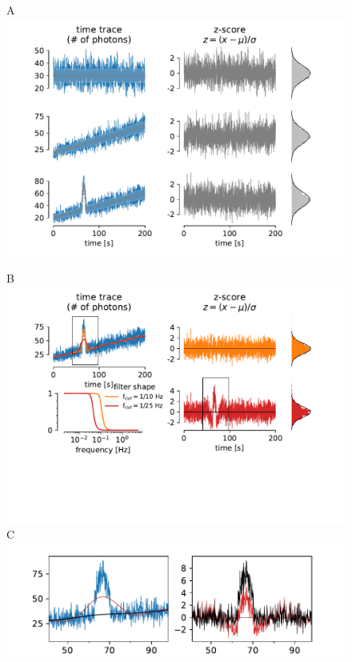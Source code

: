 \documentclass[a4paper,11pt,oneside,]{article}
\begin{document}
\begin{figure}[t]
    \centering
    \begin{minipage}{.49\textwidth}
        {\selectfont A} \includegraphics[scale=.5,trim=13mm 0 0 0,clip,align=t]{figures/z_score_1.pdf}
    \end{minipage}
    \begin{minipage}{.49\textwidth} 
        {\selectfont B} \includegraphics[scale=.5,trim=15mm 30mm 0 0,clip,align=t]{figures/z_score_2.pdf}
        {\selectfont C} \includegraphics[scale=.48,trim=5mm 0mm 0 0,clip,align=t]{figures/z_score_3.pdf}

\end{minipage}
\end{figure}
\end{document}
